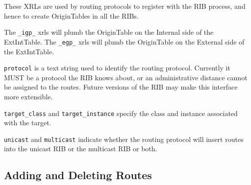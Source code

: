 \documentclass[11pt]{article}
\begin{document}
These XRLs are used by routing protocols to register with the RIB
process, and hence to create OriginTables in all the RIBs.

The {\tt \_igp\_} xrls will plumb the OriginTable on the Internal side
of the ExtIntTable.  The {\tt \_egp\_} xrls will plumb the OriginTable
on the External side of the ExtIntTable.

{\tt protocol} is a text string used to identify the routing protocol.
Currently it MUST be a protocol the RIB knows about, or an
administrative distance cannot be assigned to the routes.  Future
versions of the RIB may make this interface more extensible.

{\tt target\_class} and {\tt target\_instance} specify the
class and instance associated with the target.

{\tt unicast} and {\tt multicast} indicate whether the routing
protocol will insert routes into the unicast RIB or the multicast RIB
or both.

\subsection{Adding and Deleting Routes}
\end{document}
